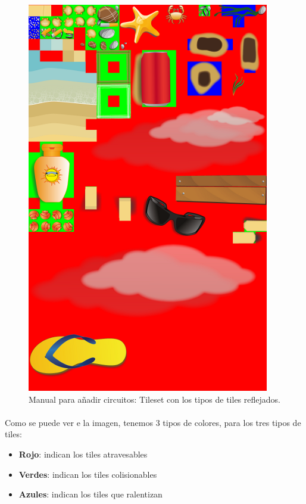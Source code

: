 \begin{figure}[H]
  \label{mixed_beach}
  \begin{center}
    \includegraphics[scale=0.4]{imagenes/manualcircuito/mixedbeach.png}
  \end{center}
  \caption{Manual para añadir circuitos: Tileset con los tipos de tiles reflejados.}
\end{figure}

\paragraph{}
Como se puede ver e la imagen, tenemos 3 tipos de colores, para los tres tipos de tiles:

\begin{itemize}
    \item \textbf{Rojo}: indican los tiles atravesables
    \item \textbf{Verdes}: indican los tiles colisionables
    \item \textbf{Azules}: indican los tiles que ralentizan
\end{itemize}

